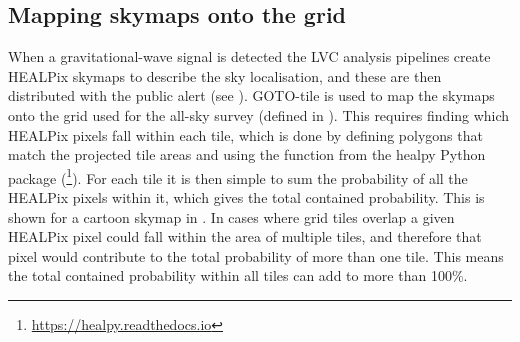 
\subsection{Mapping skymaps onto the grid}
\label{sec:mapping_skymaps}
\begin{colsection}

When a gravitational-wave signal is detected the LVC analysis pipelines create HEALPix skymaps to describe the sky localisation, and these are then distributed with the public alert (see ). GOTO-tile is used to map the skymaps onto the grid used for the all-sky survey (defined in ). This requires finding which HEALPix pixels fall within each tile, which is done by defining polygons that match the projected tile areas and using the  function from the healpy Python package (\footnote{\url{https://healpy.readthedocs.io}}). For each tile it is then simple to sum the probability of all the HEALPix pixels within it, which gives the total contained probability. This is shown for a cartoon skymap in . In cases where grid tiles overlap a given HEALPix pixel could fall within the area of multiple tiles, and therefore that pixel would contribute to the total probability of more than one tile. This means the total contained probability within all tiles can add to more than 100\%.


\end{colsection}
